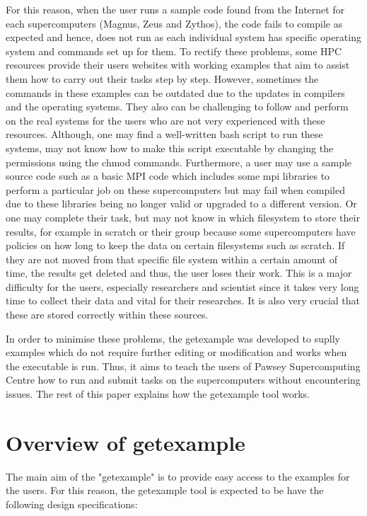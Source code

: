 \documentclass[journal]{IEEEtran}
\begin{document}
For this reason, when the user runs a sample code found from the Internet for each supercomputers (Magnus, Zeus and Zythos), the code fails to compile 
as expected and hence, does not run as each individual system has specific operating system and commands set up for them. To rectify these problems, 
some HPC resources provide their users websites with working examples that aim to assist them how to carry out their tasks step by step. 
However, sometimes the commands in these examples can be outdated due to the updates in compilers and the operating systems. They also can be challenging 
to follow and perform on the real systems for the users who are not very experienced with these resources. Although, one may find a well-written bash 
script to run these systems, may not know how to make this script executable by changing the permissions using the chmod commands. Furthermore, a user 
may use a sample source code such as a basic MPI code which includes some mpi libraries to perform a particular job on these supercomputers but may 
fail when compiled due to these libraries being no longer valid or upgraded to a different version. Or one may complete their task, but may 
not know in which filesystem to store their results, for example in scratch or their group because some supercomputers have policies on how long to keep 
the data on certain filesystems such as scratch. If they are not moved from that specific file system within a certain amount of time, the results get 
deleted and thus, the user loses their work. This is a major difficulty for the users, especially researchers and scientist since it takes very long time 
to collect their data and vital for their researches. It is also very crucial that these are stored correctly within these sources.

In order to minimise these problems, the getexample was developed to suplly examples which do not require further editing or modification and works
when the executable is run. Thus, it aims to teach the users of Pawsey Supercomputing Centre how to run and submit tasks on the supercomputers without 
encountering issues. The rest of this paper explains how the getexample tool works.   

\section{Overview of getexample}

The main aim of the "getexample" is to provide easy access to the examples for the users. For this reason, the getexample tool is expected to be have the 
following design specifications:
\end{document}
